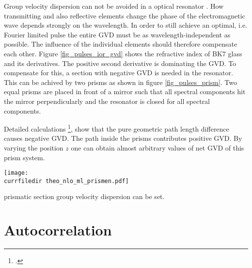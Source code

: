 Group velocity dispersion can not be avoided  in a
optical resonator . How transmitting and
also reflective elements change the phase of the
electromagnetic wave  depends strongly on the wavelength. In order to still achieve an optimal, i.e. Fourier limited pulse
the entire GVD must be as wavelength-independent as possible. The influence of the individual elements should therefore 
compensate  each other. Figure
\ref{fig_pulses_ior_gvd} shows the refractive index
of BK7 glass and its derivatives. The positive second derivative
is dominating  the GVD. To compensate for this, a section with
negative GVD is needed in the resonator. This can be  achived by two prisms as shown in figure
\ref{fig_pulses_prism}. Two equal
prisms are placed in front of a mirror such 
that all spectral components hit the mirror perpendicularly
and  the resonator is closed for all spectral components.  

 Detailed calculations \footcite{DielsRudolph1996},
show that the pure geometric path length difference causes 
negative GVD. The path inside the prisms contributes  positive GVD.  By varying the position $z$ one can obtain almost arbitrary values of net GVD of this prism system.


\begin{marginfigure}
\center
\texttt{[image: \\currfiledir theo\_nlo\_ml\_prismen.pdf]}
\caption{prismatic section
group velocity dispersion can be set.}
\label{fig_pulses_prism}
\end{marginfigure}

\section{Autocorrelation}

